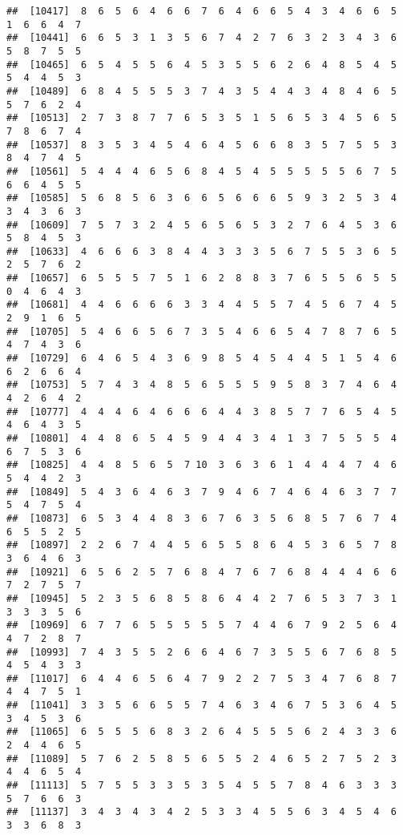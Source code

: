 \documentclass[
]{book}
\begin{document}
\begin{verbatim}
##  [10417]  8  6  5  6  4  6  6  7  6  4  6  6  5  4  3  4  6  6  5  1  6  6  4  7
##  [10441]  6  6  5  3  1  3  5  6  7  4  2  7  6  3  2  3  4  3  6  5  8  7  5  5
##  [10465]  6  5  4  5  5  6  4  5  3  5  5  6  2  6  4  8  5  4  5  5  4  4  5  3
##  [10489]  6  8  4  5  5  5  3  7  4  3  5  4  4  3  4  8  4  6  5  5  7  6  2  4
##  [10513]  2  7  3  8  7  7  6  5  3  5  1  5  6  5  3  4  5  6  5  7  8  6  7  4
##  [10537]  8  3  5  3  4  5  4  6  4  5  6  6  8  3  5  7  5  5  3  8  4  7  4  5
##  [10561]  5  4  4  4  6  5  6  8  4  5  4  5  5  5  5  5  6  7  5  6  6  4  5  5
##  [10585]  5  6  8  5  6  3  6  6  5  6  6  6  5  9  3  2  5  3  4  3  4  3  6  3
##  [10609]  7  5  7  3  2  4  5  6  5  6  5  3  2  7  6  4  5  3  6  5  8  4  5  3
##  [10633]  4  6  6  6  3  8  4  4  3  3  3  5  6  7  5  5  3  6  5  2  5  7  6  2
##  [10657]  6  5  5  5  7  5  1  6  2  8  8  3  7  6  5  5  6  5  5  0  4  6  4  3
##  [10681]  4  4  6  6  6  6  3  3  4  4  5  5  7  4  5  6  7  4  5  2  9  1  6  5
##  [10705]  5  4  6  6  5  6  7  3  5  4  6  6  5  4  7  8  7  6  5  4  7  4  3  6
##  [10729]  6  4  6  5  4  3  6  9  8  5  4  5  4  4  5  1  5  4  6  6  2  6  6  4
##  [10753]  5  7  4  3  4  8  5  6  5  5  5  9  5  8  3  7  4  6  4  4  2  6  4  2
##  [10777]  4  4  4  6  4  6  6  6  4  4  3  8  5  7  7  6  5  4  5  4  6  4  3  5
##  [10801]  4  4  8  6  5  4  5  9  4  4  3  4  1  3  7  5  5  5  4  6  7  5  3  6
##  [10825]  4  4  8  5  6  5  7 10  3  6  3  6  1  4  4  4  7  4  6  5  4  4  2  3
##  [10849]  5  4  3  6  4  6  3  7  9  4  6  7  4  6  4  6  3  7  7  5  4  7  5  4
##  [10873]  6  5  3  4  4  8  3  6  7  6  3  5  6  8  5  7  6  7  4  6  5  5  2  5
##  [10897]  2  2  6  7  4  4  5  6  5  5  8  6  4  5  3  6  5  7  8  3  6  4  6  3
##  [10921]  6  5  6  2  5  7  6  8  4  7  6  7  6  8  4  4  4  6  6  7  2  7  5  7
##  [10945]  5  2  3  5  6  8  5  8  6  4  4  2  7  6  5  3  7  3  1  3  3  3  5  6
##  [10969]  6  7  7  6  5  5  5  5  5  7  4  4  6  7  9  2  5  6  4  4  7  2  8  7
##  [10993]  7  4  3  5  5  2  6  6  4  6  7  3  5  5  6  7  6  8  5  4  5  4  3  3
##  [11017]  6  4  4  6  5  6  4  7  9  2  2  7  5  3  4  7  6  8  7  4  4  7  5  1
##  [11041]  3  3  5  6  6  5  5  7  4  6  3  4  6  7  5  3  6  4  5  3  4  5  3  6
##  [11065]  6  5  5  5  6  8  3  2  6  4  5  5  5  6  2  4  3  3  6  2  4  4  6  5
##  [11089]  5  7  6  2  5  8  5  6  5  5  2  4  6  5  2  7  5  2  3  4  4  6  5  4
##  [11113]  5  7  5  5  3  3  5  3  5  4  5  5  7  8  4  6  3  3  3  5  7  6  6  3
##  [11137]  3  4  3  4  3  4  2  5  3  3  4  5  5  6  3  4  5  4  6  3  3  6  8  3

\end{verbatim}
\end{document}
